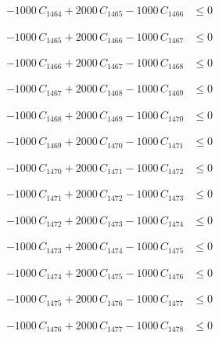 \documentclass[a4paper,11pt]{article}
\begin{document}
\begin{align}
-1000\,C_{1464} + 2000\,C_{1465} - 1000\,C_{1466} &\leq 0 \nonumber
\end{align}

\begin{align}
-1000\,C_{1465} + 2000\,C_{1466} - 1000\,C_{1467} &\leq 0 \nonumber
\end{align}

\begin{align}
-1000\,C_{1466} + 2000\,C_{1467} - 1000\,C_{1468} &\leq 0 \nonumber
\end{align}

\begin{align}
-1000\,C_{1467} + 2000\,C_{1468} - 1000\,C_{1469} &\leq 0 \nonumber
\end{align}

\begin{align}
-1000\,C_{1468} + 2000\,C_{1469} - 1000\,C_{1470} &\leq 0 \nonumber
\end{align}

\begin{align}
-1000\,C_{1469} + 2000\,C_{1470} - 1000\,C_{1471} &\leq 0 \nonumber
\end{align}

\begin{align}
-1000\,C_{1470} + 2000\,C_{1471} - 1000\,C_{1472} &\leq 0 \nonumber
\end{align}

\begin{align}
-1000\,C_{1471} + 2000\,C_{1472} - 1000\,C_{1473} &\leq 0 \nonumber
\end{align}

\begin{align}
-1000\,C_{1472} + 2000\,C_{1473} - 1000\,C_{1474} &\leq 0 \nonumber
\end{align}

\begin{align}
-1000\,C_{1473} + 2000\,C_{1474} - 1000\,C_{1475} &\leq 0 \nonumber
\end{align}

\begin{align}
-1000\,C_{1474} + 2000\,C_{1475} - 1000\,C_{1476} &\leq 0 \nonumber
\end{align}

\begin{align}
-1000\,C_{1475} + 2000\,C_{1476} - 1000\,C_{1477} &\leq 0 \nonumber
\end{align}

\begin{align}
-1000\,C_{1476} + 2000\,C_{1477} - 1000\,C_{1478} &\leq 0 \nonumber
\end{align}
\end{document}
